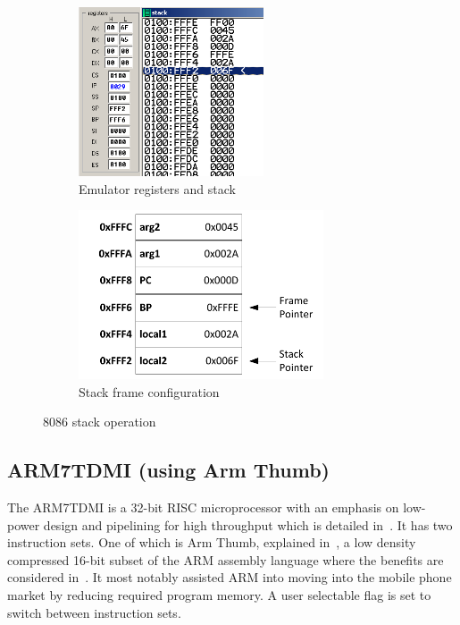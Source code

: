 \documentclass[12pt,a4paper]{article}
\begin{document}
\begin{figure}[htb]
        \centering
        \begin{subfigure}[b]{0.5\textwidth}
                \includegraphics[height=5cm]{Figures/emu.png}
                \caption{Emulator registers and stack}
                \label{fig:emu}
        \end{subfigure}%
        \begin{subfigure}[b]{0.5\textwidth}
                \includegraphics[height=5cm]{Figures/stack.pdf}
                \caption{Stack frame configuration}
                \label{fig:stack}
        \end{subfigure}
        \caption{8086 stack operation}
        \label{fig:8086}
\end{figure}







\subsection{ARM7TDMI (using Arm Thumb)}
The ARM7TDMI is a 32-bit RISC microprocessor with an emphasis on low-power design and pipelining for high throughput which is detailed in~\cite{ARM7TDMI}.
It has two instruction sets. 
One of which is Arm Thumb, explained in~\cite{arm}, a low density compressed 16-bit subset of the ARM assembly language where the benefits are considered in~\cite{ARMs}.
It most notably assisted ARM into moving into the mobile phone market by reducing required program memory. 
A user selectable flag is set to switch between instruction sets.
\end{document}
